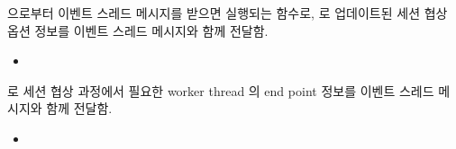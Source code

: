 \documentclass[a4paper,10pt,english]{sphinxmanual}
\begin{document}
\begin{fulllineitems}
\begin{fulllineitems}
\label{\detokenize{_SessionManager:SessionManager._slUpdateNegotiationOptions}}
\pysigstartsignatures
{}
\pysigstopsignatures
\sphinxAtStartPar
{\hyperref[\detokenize{_DHDaemon:dhdaemon}]{}} 으로부터  이벤트 스레드 메시지를 받으면 실행되는 함수로,
{\hyperref[\detokenize{_SessionListener:sessionlistener}]{}} 로 업데이트된 세션 협상 옵션 정보를  이벤트 스레드 메시지와 함께 전달함.


\nopagebreak

\begin{itemize}
\item {} 
\sphinxAtStartPar
{\hyperref[\detokenize{_SessionListener:SessionListener._smListener}]{}}

\end{itemize}



\end{fulllineitems}


\begin{fulllineitems}
\label{\detokenize{_SessionManager:SessionManager._srGetNewSessionInfo}}
\pysigstartsignatures
{}
\pysigstopsignatures
\sphinxAtStartPar
{\hyperref[\detokenize{_SessionRequester:sessionrequester}]{}} 로 세션 협상 과정에서 필요한 {\hyperref[\detokenize{_Session:session}]{}} worker thread 의 end point 정보를
 이벤트 스레드 메시지와 함께 전달함.


\nopagebreak

\begin{itemize}
\item {} 
\sphinxAtStartPar
{\hyperref[\detokenize{_SessionRequester:SessionRequester._smListener}]{}}


\end{itemize}
\end{fulllineitems}
\end{fulllineitems}
\end{document}
